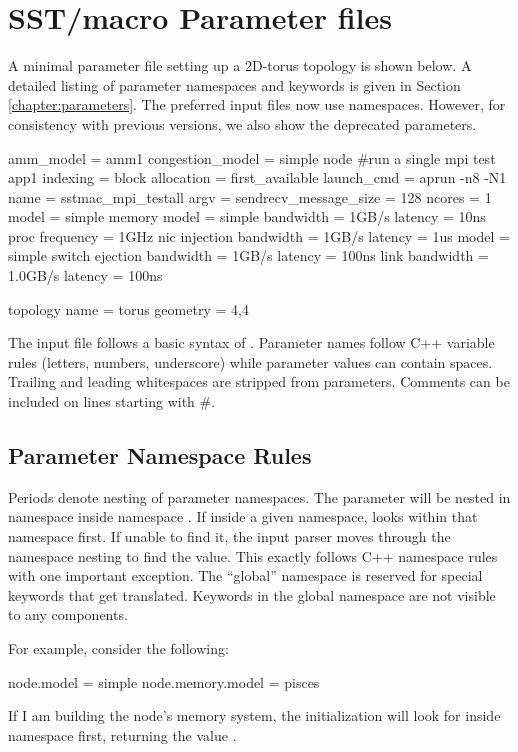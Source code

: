 
\section{SST/macro Parameter files}
\label{sec:parameters}
A minimal parameter file setting up a 2D-torus topology is shown below. 
A detailed listing of parameter namespaces and keywords is given in Section \ref{chapter:parameters}.
The preferred input files now use namespaces.
However, for consistency with previous versions, we also show the deprecated parameters.

\begin{ViFile}
amm_model = amm1
congestion_model = simple
node {
 #run a single mpi test
 app1 {
  indexing = block
  allocation = first_available
  launch_cmd = aprun -n8 -N1
  name = sstmac_mpi_testall
  argv =
  sendrecv_message_size = 128
 }
 ncores = 1
 model = simple
 memory {
  model = simple
  bandwidth = 1GB/s
  latency = 10ns
 }
 proc {
  frequency = 1GHz
 }
 nic {
  injection {
   bandwidth = 1GB/s
   latency = 1us
  }
  model = simple
 }
}
switch {
 ejection {
  bandwidth = 1GB/s
  latency = 100ns
 }
 link {
  bandwidth = 1.0GB/s
   latency = 100ns
 }
}

topology {
 name = torus
 geometry = 4,4
}
\end{ViFile}
The input file follows a basic syntax of .  
Parameter names follow C++ variable rules (letters, numbers, underscore) while parameter values can contain spaces.  Trailing and leading whitespaces are stripped from parameters.
Comments can be included on lines starting with \#.

\subsection{Parameter Namespace Rules}
\label{subsec:parameterNamespace}
Periods denote nesting of parameter namespaces.
The parameter  will be nested in namespace  inside namespace .
If inside a given namespace, \sstmacro looks within that namespace first.
If unable to find it, the input parser moves through the namespace nesting to find the value.
This exactly follows C++ namespace rules with one important exception. 
The ``global'' namespace is reserved for special keywords that get translated.
Keywords in the global namespace are not visible to any components.


For example, consider the following:
\begin{ViFile}
node.model = simple
node.memory.model = pisces
\end{ViFile}
If I am building the node's memory system, the initialization will look for  inside namespace  first, returning the value . 


